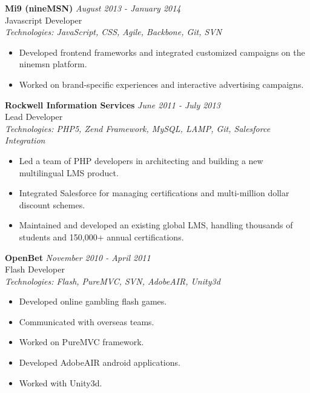 \documentclass[a4paper,10pt]{article}
\begin{document}
\vspace{1em}

\textbf{Mi9 (nineMSN)} \hfill \textit{August 2013 - January 2014} \\
Javascript Developer \\
\textit{Technologies: JavaScript, CSS, Agile, Backbone, Git, SVN}
\begin{itemize}
    \item Developed frontend frameworks and integrated customized campaigns on the ninemsn platform.
    \item Worked on brand-specific experiences and interactive advertising campaigns.
\end{itemize}

\vspace{1em}

\textbf{Rockwell Information Services} \hfill \textit{June 2011 - July 2013} \\
Lead Developer \\
\textit{Technologies: PHP5, Zend Framework, MySQL, LAMP, Git, Salesforce Integration}
\begin{itemize}
    \item Led a team of PHP developers in architecting and building a new multilingual LMS product.
    \item Integrated Salesforce for managing certifications and multi-million dollar discount schemes.
    \item Maintained and developed an existing global LMS, handling thousands of students and 150,000+ annual certifications.
\end{itemize}

\vspace{1em}

\textbf{OpenBet} \hfill \textit{November 2010 - April 2011} \\
Flash Developer \\
\textit{Technologies: Flash, PureMVC, SVN, AdobeAIR, Unity3d}
\begin{itemize}
    \item Developed online gambling flash games.
    \item Communicated with overseas teams.
    \item Worked on PureMVC framework.
    \item Developed AdobeAIR android applications.
    \item Worked with Unity3d.
\end{itemize}

\vspace{1em}
\end{document}
